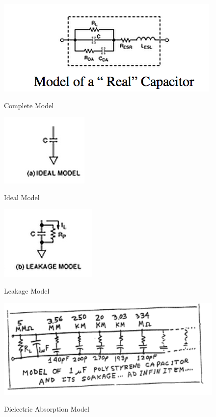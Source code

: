 \begin{figure}
    \includegraphics[keepaspectratio=true,scale=0.75]{../figures/completeModel.png}
    \centering
    \cite{anal_capProps}
    \caption{Complete Model}
    \label{completeModel}
\end{figure}

\begin{figure}
    \includegraphics[keepaspectratio=true,scale=0.5]{../figures/idealModel.png}
    \centering
    \cite{anal_capProps}
    \caption{Ideal Model}
    \label{idealModel}
\end{figure}

\begin{figure}
    \includegraphics[keepaspectratio=true]{../figures/leakageModel.png}
    \centering
    \cite{anal_capProps}
    \caption{Leakage Model}
    \label{leakModel}
\end{figure}

\begin{figure}
    \includegraphics[keepaspectratio=true,scale=.3]{../figures/da_model.png}
    \centering
    \cite{rap_da}
    \caption{Dielectric Absorption Model}
    \label{daModel}
\end{figure}

